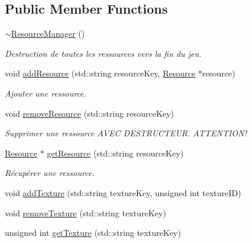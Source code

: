 \subsection*{Public Member Functions}
\begin{DoxyCompactItemize}
\item 
\hypertarget{class_resource_manager_a671c186e4630599e7e36d000c53eaf80}{}\hyperlink{class_resource_manager_a671c186e4630599e7e36d000c53eaf80}{$\sim$\+Resource\+Manager} ()\label{class_resource_manager_a671c186e4630599e7e36d000c53eaf80}

\begin{DoxyCompactList}\small\item\em Destruction de toutes les ressources vers la fin du jeu. \end{DoxyCompactList}\item 
\hypertarget{class_resource_manager_ac78303eb794db103a0d43480ea42207b}{}void \hyperlink{class_resource_manager_ac78303eb794db103a0d43480ea42207b}{add\+Resource} (std\+::string resource\+Key, \hyperlink{class_resource}{Resource} $\ast$resource)\label{class_resource_manager_ac78303eb794db103a0d43480ea42207b}

\begin{DoxyCompactList}\small\item\em Ajouter une ressource. \end{DoxyCompactList}\item 
\hypertarget{class_resource_manager_ab643fdd28a7929892b5d5d1ae2686601}{}void \hyperlink{class_resource_manager_ab643fdd28a7929892b5d5d1ae2686601}{remove\+Resource} (std\+::string resource\+Key)\label{class_resource_manager_ab643fdd28a7929892b5d5d1ae2686601}

\begin{DoxyCompactList}\small\item\em Supprimer une ressource A\+V\+E\+C D\+E\+S\+T\+R\+U\+C\+T\+E\+U\+R. A\+T\+T\+E\+N\+T\+I\+O\+N! \end{DoxyCompactList}\item 
\hypertarget{class_resource_manager_ae94da99cedb67a52f3326ed83b9f3c0f}{}\hyperlink{class_resource}{Resource} $\ast$ \hyperlink{class_resource_manager_ae94da99cedb67a52f3326ed83b9f3c0f}{get\+Resource} (std\+::string resource\+Key)\label{class_resource_manager_ae94da99cedb67a52f3326ed83b9f3c0f}

\begin{DoxyCompactList}\small\item\em Récupérer une ressource. \end{DoxyCompactList}\item 
void \hyperlink{class_resource_manager_a850b34fa48b9e5fbb26f64b0b03cc657}{add\+Texture} (std\+::string texture\+Key, unsigned int texture\+I\+D)
\item 
void \hyperlink{class_resource_manager_a0df01e70b147a488544728b4afbefca5}{remove\+Texture} (std\+::string texture\+Key)
\item 
unsigned int \hyperlink{class_resource_manager_ae1f882a42ea298740729f3a5b73f238c}{get\+Texture} (std\+::string texture\+Key)
\end{DoxyCompactItemize}
